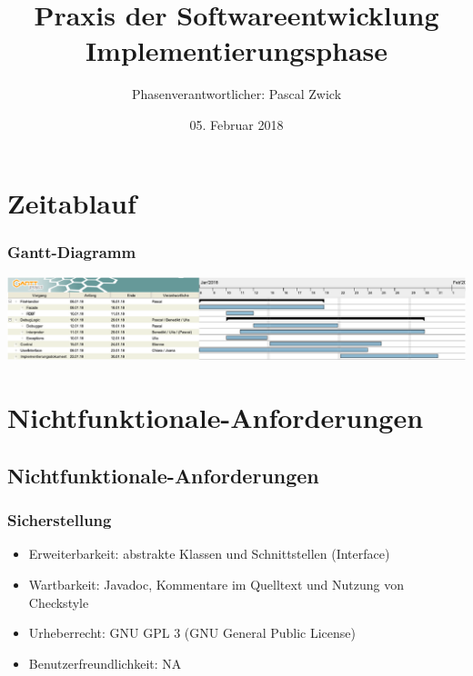 \documentclass{beamer}
\title[Implementierungsphase]{Praxis der Softwareentwicklung\\ Implementierungsphase} %
\author{Phasenverantwortlicher: Pascal Zwick} %
\institute[PSE] %
{

}
\date{05. Februar 2018} %
\begin{document}
\begin{frame}
\titlepage %
\end{frame}



\section{Zeitablauf} %
\begin{frame}
\frametitle{Gantt-Diagramm}
\includegraphics[scale=0.4]{../ganntDiagramm_neu_crop.pdf}
\end{frame}

\section{Nichtfunktionale-Anforderungen}
\subsection{Nichtfunktionale-Anforderungen}
\begin{frame}
\frametitle{Sicherstellung}
\begin{itemize}
\item Erweiterbarkeit: abstrakte Klassen und Schnittstellen (Interface)
\item Wartbarkeit: Javadoc, Kommentare im Quelltext und Nutzung von Checkstyle
\item Urheberrecht: GNU GPL 3 (GNU General Public License)
\item Benutzerfreundlichkeit: NA
\end{itemize}
\end{frame}
\end{document}
